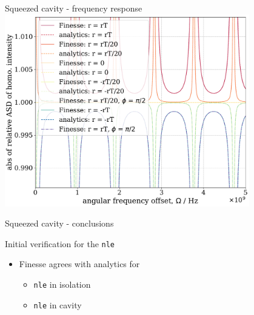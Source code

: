 \documentclass[12pt]{beamer}
\newcommand{\code}[1]{\texttt{#1}}
\begin{document}
\begin{frame}{Squeezed cavity - frequency response}
\centering
\includegraphics[width=0.8\textwidth]{figures/squeezed_cavity_relative_qhd_vs_freq_comparison.pdf}
\end{frame}

\begin{frame}{Squeezed cavity - conclusions}
\begin{block}{Initial verification for the \code{nle}}
\begin{itemize}
\item Finesse agrees with analytics for 
    \begin{itemize}
    \item \code{nle} in isolation
    \item \code{nle} in cavity
    \end{itemize}
\end{itemize}
\end{block}
\end{frame}
\end{document}
